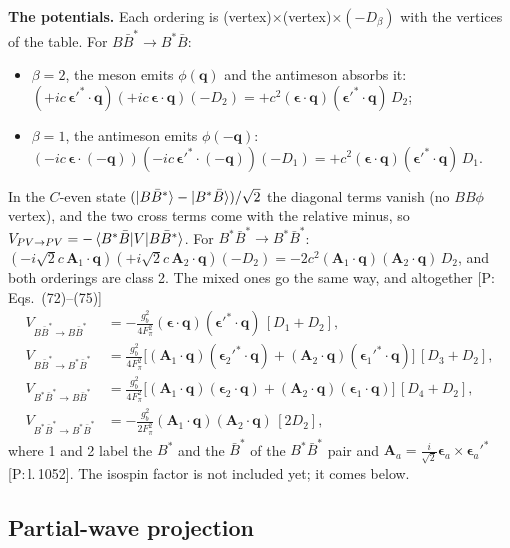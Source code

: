 \documentclass[11pt,a4paper]{article}
\newcommand{\tagP}[1]{\textcolor{blue!65!black}{\textsf{\small[P:\,#1]}}}
\newenvironment{aiadd}{\par}{\par}
\begin{document}
\begin{aiadd}
	\textbf{The potentials.} Each ordering is (vertex)$\times$(vertex)$\times(-D_\beta)$ with the vertices of the table. For $B\bar B^*\to B^*\bar B$:
	\begin{itemize}
		\item $\beta=2$, the meson emits $\phi(\bm q)$ and the antimeson absorbs it: $(+ic\,\bm\epsilon'^*\cdot\bm q)(+ic\,\bm\epsilon\cdot\bm q)(-D_2)=+c^2(\bm\epsilon\cdot\bm q)(\bm\epsilon'^*\cdot\bm q)\,D_2$;
		\item $\beta=1$, the antimeson emits $\phi(-\bm q)$: $(-ic\,\bm\epsilon\cdot(-\bm q))(-ic\,\bm\epsilon'^*\cdot(-\bm q))(-D_1)=+c^2(\bm\epsilon\cdot\bm q)(\bm\epsilon'^*\cdot\bm q)\,D_1$.
	\end{itemize}
	In the $C$-even state $(\ket{B\bar B^*}-\ket{B^*\bar B})/\sqrt2$ the diagonal terms vanish (no $BB\phi$ vertex), and the two cross terms come with the relative minus, so $V_{PV\to PV}=-\braket{B^*\bar B|V|B\bar B^*}$. For $B^*\bar B^*\to B^*\bar B^*$: $(-i\sqrt2c\,\bm A_1\cdot\bm q)(+i\sqrt2c\,\bm A_2\cdot\bm q)(-D_2)=-2c^2(\bm A_1\cdot\bm q)(\bm A_2\cdot\bm q)\,D_2$, and both orderings are class 2. The mixed ones go the same way, and altogether \tagP{Eqs.~(72)--(75)}
	\begin{align*}
		V_{B\bar B^*\to B\bar B^*}     & =-\frac{g_b^2}{4F_\pi^2}(\bm\epsilon\cdot\bm q)(\bm\epsilon'^*\cdot\bm q)\,[D_1+D_2],                                                        \\
		V_{B\bar B^*\to B^*\bar B^*}   & =\frac{g_b^2}{4F_\pi^2}\big[(\bm A_1\cdot\bm q)(\bm\epsilon_2'^*\cdot\bm q)+(\bm A_2\cdot\bm q)(\bm\epsilon_1'^*\cdot\bm q)\big]\,[D_3+D_2], \\
		V_{B^*\bar B^*\to B\bar B^*}   & =\frac{g_b^2}{4F_\pi^2}\big[(\bm A_1\cdot\bm q)(\bm\epsilon_2\cdot\bm q)+(\bm A_2\cdot\bm q)(\bm\epsilon_1\cdot\bm q)\big]\,[D_4+D_2],       \\
		V_{B^*\bar B^*\to B^*\bar B^*} & =-\frac{g_b^2}{2F_\pi^2}(\bm A_1\cdot\bm q)(\bm A_2\cdot\bm q)\,[2D_2],
	\end{align*}
	where 1 and 2 label the $B^*$ and the $\bar B^*$ of the $B^*\bar B^*$ pair and $\bm A_a=\frac{i}{\sqrt2}\bm\epsilon_a\times\bm\epsilon_a'^*$ \tagP{l.\,1052}. The isospin factor is not included yet; it comes below.
\end{aiadd}

\subsection{Partial-wave projection}
\end{document}
